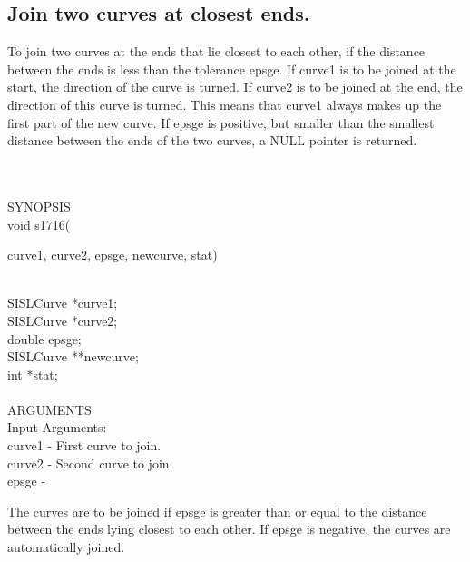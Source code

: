 \subsection{Join two curves at closest ends.}
\begin{minipg1}
  To join two curves at the ends that lie closest to each other, if the
  distance between the ends is less than the tolerance {\fov epsge}. If
  {\fov curve1} is to be joined at the start, the direction of the curve is turned.
  If {\fov curve2} is to be joined at the end, the direction of this
  curve is turned. This means that {\fov curve1} always makes up the
  first part of the new curve. If {\fov epsge} is positive, but smaller
  than the smallest distance between the ends of the two curves, a NULL
  pointer is returned.
\end{minipg1} \\ \\
SYNOPSIS\\
        \>void s1716(\begin{minipg3}
        {\fov curve1}, {\fov curve2}, {\fov epsge}, {\fov newcurve}, {\fov stat})
                \end{minipg3}\\[0.3ex]
                \>\>    SISLCurve       \>      *{\fov curve1};\\
                \>\>    SISLCurve       \>      *{\fov curve2};\\
                \>\>    double  \>      {\fov epsge};\\
                \>\>    SISLCurve       \>      **{\fov newcurve};\\
                \>\>    int     \>      *{\fov stat};\\
\\
ARGUMENTS\\
        \>Input Arguments:\\
        \>\>    {\fov curve1}   \> - \> First curve to join.\\
        \>\>    {\fov curve2}   \> - \> Second curve to join.\\
        \>\>    {\fov epsge}    \> - \> \begin{minipg2}
                                The curves are to be joined if {\fov epsge} is
                                greater than or equal to the distance
                                between the ends lying closest to each
                                other. If {\fov epsge} is negative, the
                                curves are automatically joined.
                                \end{minipg2}\\[0.3ex]
